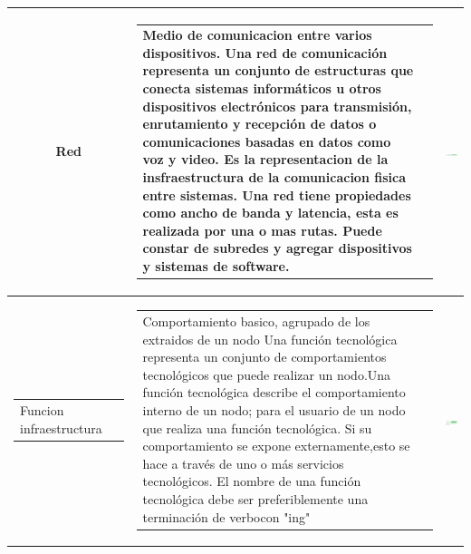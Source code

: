 \begin{longtable}{|c|c|c|}
	Red
	&
	\begin{tabular}{p{8cm}p{3cm}}
		Medio de comunicacion entre varios dispositivos. 
		Una red de comunicación representa un conjunto de estructuras que conecta sistemas informáticos u otros dispositivos electrónicos para 
		transmisión, enrutamiento y recepción de datos o comunicaciones basadas en datos como voz y video. Es la representacion de la insfraestructura de la comunicacion fisica entre sistemas. Una red tiene propiedades como ancho de banda y latencia, esta es realizada por una o mas rutas.
		Puede constar de subredes y agregar dispositivos y sistemas de software.
		
	\end{tabular}	
	& \includegraphics[width=0.2\linewidth, height=0.05\textheight]{imgs/conceptos/tecnologica/redComunicacion}
	\\
	\hline
	
	\begin{tabular}{p{2cm}p{3cm}}
		Funcion infraestructura 
	\end{tabular}
	&
	\begin{tabular}{p{8cm}p{3cm}}
		Comportamiento basico, agrupado de los extraidos de un nodo 
		Una función tecnológica representa un conjunto de comportamientos tecnológicos que puede realizar un nodo.Una función tecnológica describe el comportamiento interno de un nodo; para el usuario de un nodo que realiza una función tecnológica. Si su comportamiento se expone externamente,esto se hace a través de uno o más servicios tecnológicos. El nombre de una función tecnológica debe ser preferiblemente una terminación de verbocon "ing"
	\end{tabular}
	& \includegraphics[width=0.2\linewidth, height=0.05\textheight]{imgs/conceptos/tecnologica/dispositivo}
	\\
	\hline
	

\end{longtable}
